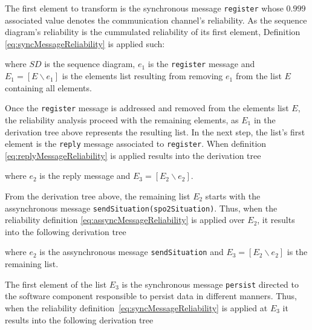 The first element to transform is the synchronous message \texttt{register}
whose $0.999$ associated value denotes the communication channel's reliability.
As the sequence diagram's reliability is the cummulated reliability of its first
element, Definition \ref{eq:syncMessageReliability} is applied such: 


where $SD$ is the sequence diagram, $e_1$ is the \texttt{register} message and
$E_1 = [E \backslash e_1]$ is the elements list resulting from removing $e_1$
from the list $E$ containing all elements.

Once the \texttt{register} message is addressed and removed from the elements
list $E$, the reliability analysis proceed with the remaining elements, as $E_1$
in the derivation tree above represents the resulting list. In the next step,
the list's first element is the \texttt{reply} message associated to
\texttt{register}.  When definition \ref{eq:replyMessageReliability} is applied
results into the derivation tree


where $e_2$ is the reply message and $E_3=[E_2 \backslash e_2]$.

From the derivation tree above, the remaining list $E_2$ starts with the
assynchronous message \texttt{sendSituation(spo2Situation)}. Thus, when the
reliability definition \ref{eq:assyncMessageReliability} is applied over $E_2$,
it results into the following derivation tree

where $e_2$ is the assynchronous message \texttt{sendSituation} and $E_3 =
[E_2 \backslash e_2]$ is the remaining list. 

The first element of the list $E_3$ is the synchronous message \texttt{persist}
directed to the software component responsible to persist data in different
manners. Thus, when the reliability definition~\ref{eq:syncMessageReliability}
is applied at $E_3$ it results into the following derivation tree


